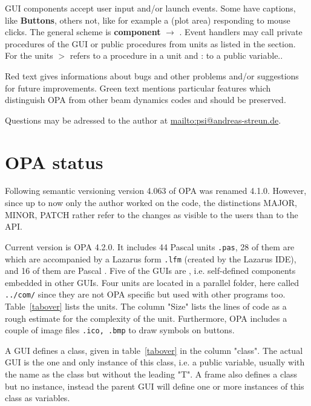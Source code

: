 \documentclass[12pt]{article}
\newcommand\code[1]{{\tt #1}}
\newcommand{\ofld}[1]{\colorbox{black!15}{{\bf #1}}}
\newcommand{\ofldx}[1]{\colorbox{black!15}{(#1)}}
\newcommand\guico[1]{{\color{blue}\code{#1}}}
\newcommand{\unico}[1]{{\color{burntorange}\code{#1}}}
\newcommand{\evcod}[2]{\ofld{#1} $\rightarrow$ \guico{#2}}
\newcommand{\prcod}[2]{\opauni{#1}$>$\unico{#2}}
\newcommand{\vrcod}[2]{\opauni{#1}:\unico{#2}}
\newcommand{\opagui}[1]{\colorbox{blue!20}{{\color{black}\code{#1}}}}
\newcommand{\opaguif}[1]{\colorbox{violet!30}{{\color{black}\code{#1}}}}
\newcommand{\opauni}[1]{\colorbox{orange!30}{{\color{black}\code{#1}}}}
\newcommand{\todo}[1]{{\color{red} #1}}
\newcommand{\feature}[1]{{\color{cadmiumgreen} #1}}
\begin{document}
GUI components accept user input and/or launch events. Some have captions, like \ofld{Buttons}, others not, like for example a \ofldx{plot area} responding to mouse clicks. The general scheme is \evcod{component}{event handler}. Event handlers may call private procedures of the GUI or public procedures from units as listed in the \guico{uses} section. For the units \prcod{unit}{procedure} refers to a procedure in a unit and \vrcod{unit}{variable} to a public variable..

\todo{Red text gives informations about bugs and other problems and/or suggestions for future improvements.} \feature{Green text mentions particular features which distinguish OPA from other beam dynamics codes and should be preserved.}

Questions may be adressed to the author at \url{mailto:psi@andreas-streun.de}.

\newpage


\section{OPA status}

Following semantic versioning \cite{semver} version 4.063 of OPA was renamed 4.1.0. However, since up to now only the author worked on the code, the distinctions MAJOR, MINOR, PATCH rather refer to the changes as visible to the users than to the API. 


Current version is OPA 4.2.0. It includes 44 Pascal units \code{.pas}, 28 of them are \opagui{GUIs} which are accompanied by a Lazarus form \code{.lfm} (created by the Lazarus IDE), and 16 of them are Pascal \opauni{units}. Five of the GUIs are \opaguif{frames}, i.e. self-defined components embedded in other GUIs. Four units are located in a parallel folder, here called \code{../com/} since they are not OPA specific but used with other programs too.
Table~\ref{tabover} lists the units. The column "Size" lists the lines of code as a rough estimate for the complexity of the unit. Furthermore, OPA includes a couple of image files \code{.ico, .bmp} to draw symbols on buttons. 


A GUI defines a class, given in table~\ref{tabover} in the column "class". The actual GUI is the one and only instance of this class, i.e. a public variable, usually with the name as the class but without the leading "T". A frame also defines a class but no instance, instead the parent GUI will define one or more instances of this class as variables.
\end{document}
